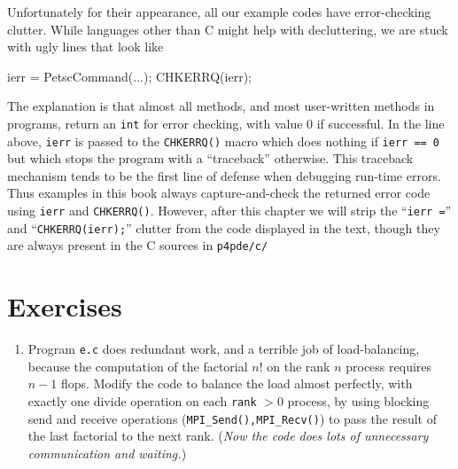 Unfortunately for their appearance, all our \PETSc example codes have error-checking clutter.  While languages other than C might help with decluttering, we are stuck with ugly lines that look like
\begin{code}
ierr = PetscCommand(...); CHKERRQ(ierr);
\end{code}
The explanation is that almost all \PETSc methods, and most user-written methods in \PETSc programs, return an \texttt{int} for error checking, with value $0$ if successful.  In the line above, \texttt{ierr} is passed to the \texttt{CHKERRQ()} macro which does nothing if \texttt{ierr == 0} but which stops the program with a ``traceback'' otherwise.  This traceback mechanism tends to be the first line of defense when debugging run-time errors.  Thus examples in this book always capture-and-check the returned error code using \texttt{ierr} and \texttt{CHKERRQ()}.  However, after this chapter we will strip the ``\texttt{ierr =}'' and ``\texttt{CHKERRQ(ierr);}'' clutter from the code displayed in the text, though they are always present in the C sources in \texttt{p4pde/c/}


\bigskip
\section{Exercises}

\renewcommand{\labelenumi}{\arabic{chapter}.\arabic{enumi}\quad}
\begin{enumerate}
\item Program \texttt{e.c} does redundant work, and a terrible job of load-balancing, because the computation of the factorial $n!$ on the rank $n$ process requires $n-1$ flops.  Modify the code to balance the load almost perfectly, with exactly one divide operation on each \texttt{rank} $>0$ process, by using blocking send and receive operations (\texttt{MPI\_Send(),MPI\_Recv()}) to pass the result of the last factorial to the next rank.  (\emph{Now the code does lots of unnecessary communication and waiting.})


\end{enumerate}
